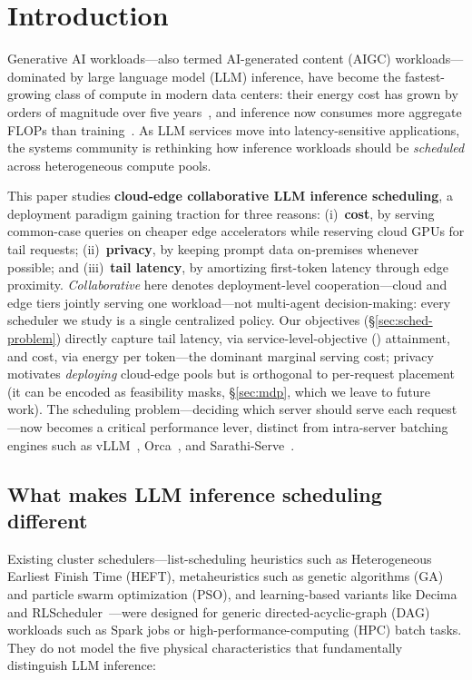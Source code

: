 \section{Introduction}
\label{sec:intro}

Generative AI workloads---also termed AI-generated content
(AIGC) workloads---dominated by large language model (LLM)
inference, have become the fastest-growing class of compute in
modern data centers: their energy cost has grown by orders of
magnitude over five years~\cite{patterson2021carbon}, and
inference now consumes more aggregate FLOPs than
training~\cite{patel2024splitwise}. As LLM services move into
latency-sensitive applications, the systems community is
rethinking how inference workloads should be \emph{scheduled}
across heterogeneous compute pools.

This paper studies \textbf{cloud-edge collaborative LLM inference
scheduling}, a deployment paradigm gaining traction for three
reasons: (i)~\textbf{cost}, by serving common-case queries on
cheaper edge accelerators while reserving cloud GPUs for tail
requests; (ii)~\textbf{privacy}, by keeping prompt data on-premises
whenever possible; and (iii)~\textbf{tail latency}, by amortizing
first-token latency through edge proximity.
\emph{Collaborative} here denotes deployment-level
cooperation---cloud and edge tiers jointly serving one
workload---not multi-agent decision-making: every scheduler we
study is a single centralized policy. Our objectives
(\S\ref{sec:sched-problem}) directly capture tail latency, via
service-level-objective (\slo) attainment, and cost, via energy
per token---the dominant marginal serving cost; privacy
motivates \emph{deploying} cloud-edge pools but is orthogonal
to per-request placement (it can be encoded as feasibility
masks, \S\ref{sec:mdp}, which we leave to future
work). The scheduling
problem---deciding which server should serve each request---now
becomes a critical performance lever, distinct from intra-server
batching engines such as
vLLM~\cite{kwon2023vllm}, Orca~\cite{yu2022orca}, and
Sarathi-Serve~\cite{agrawal2024sarathi}.

\subsection{What makes LLM inference scheduling different}

Existing cluster schedulers---list-scheduling heuristics such
as Heterogeneous Earliest Finish Time (HEFT), metaheuristics
such as genetic algorithms (GA) and particle swarm optimization
(PSO), and learning-based variants like
Decima~\cite{mao2019decima} and
RLScheduler~\cite{zhang2020rlscheduler}---were designed for
generic directed-acyclic-graph (DAG) workloads such as Spark
jobs or high-performance-computing (HPC) batch tasks. They do not
model the five physical characteristics that fundamentally
distinguish LLM inference:

